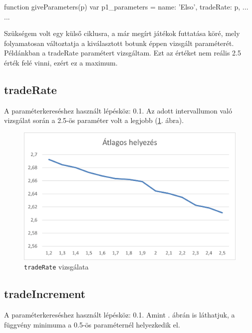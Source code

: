\begin{javascript}
function giveParameters(p) {
  var p1_parameters = {
    name: 'Elso',
    tradeRate: p,
      ...
  }
  ...
}
\end{javascript}

Szükségem volt egy külső ciklusra, a már megírt játékok futtatása köré, mely folyamatosan változtatja a kiválasztott botunk éppen vizsgált paraméterét. Példánkban a tradeRate paramétert vizsgáltam. Ezt az értéket nem reális 2.5 érték felé vinni, ezért ez a maximum.

\subsection{tradeRate}

A paraméterkereséshez használt lépésköz: 0.1. Az adott intervallumon való vizsgálat során a 2.5-ös paraméter volt a legjobb (\ref{fig:tradeRate}. ábra).

\begin{figure}[h!]
\centering
\includegraphics[scale=0.2]{images/Kep1w.png}
\caption{\texttt{tradeRate} vizsgálata}
\label{fig:tradeRate}
\end{figure}

\subsection{tradeIncrement}

A paraméterkereséshez használt lépésköz: 0.1. Amint . ábrán is láthatjuk, a függvény minimuma a 0.5-ös paraméternél helyezkedik el.

